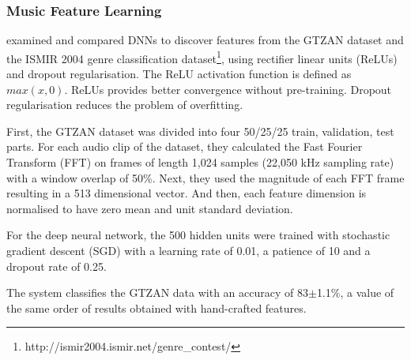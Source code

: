 \subsubsection{Music Feature Learning}
\textcite{Sigtia20146959} examined and compared DNNs to discover features from the GTZAN dataset and the ISMIR 2004 genre classification dataset\footnote{http://ismir2004.ismir.net/genre\_contest/}, using rectifier linear units (ReLUs) and dropout regularisation. The ReLU activation function is defined as $max(x,0)$. ReLUs provides better convergence without pre-training. Dropout regularisation reduces the problem of overfitting.

First, the GTZAN dataset was divided into four 50/25/25 train, validation, test parts. For each audio clip of the dataset, they calculated the Fast Fourier Transform (FFT) on frames of length 1,024 samples (22,050 kHz sampling rate) with a window overlap of 50\%. Next, they used the magnitude of each FFT frame resulting in a 513 dimensional vector. And then, each feature dimension is normalised to have zero mean and unit standard deviation.

For the deep neural network, the 500 hidden units were trained with stochastic gradient descent (SGD) with a learning rate of 0.01, a patience of 10 and a dropout rate of 0.25.

The system classifies the GTZAN data with an accuracy of 83$\pm$1.1\%, a value of the same order of results obtained with hand-crafted features.

